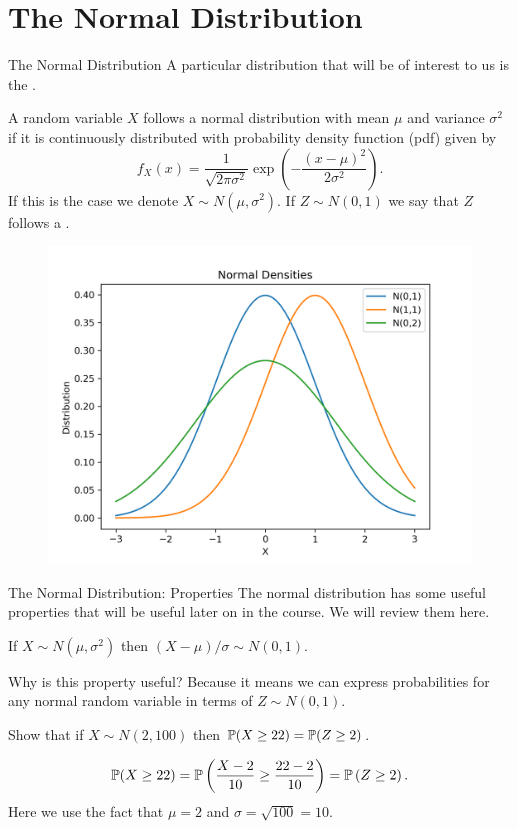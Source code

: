 \documentclass[notheorems,9pt, handout]{beamer}
\begin{document}
\section{The Normal Distribution}
\begin{frame}{The Normal Distribution} 
	\label{frame:nd-into}
	A particular distribution that will be of interest to us is the .
	\begin{definition}
		\label{def:nd}
		A random variable \(X\) follows a normal distribution with mean \(\mu\) and variance \(\sigma^2\) if it is continuously distributed with probability density function (pdf) given by 
		\begin{equation}
			f_X(x) = \frac{1}{\sqrt{2\pi\sigma^2}}\exp\left(-\frac{(x-\mu)^2}{2\sigma^2}\right)
		.\end{equation} 
		If this is the case we denote \(X\sim N(\mu,\sigma^2)\). If \(Z\sim N(0,1)\) we say that \(Z\) follows a .	
	\end{definition}
	\begin{figure}[htpb]
		\centering
		\includegraphics[width=0.4\linewidth]{normal-density.png}	
	\end{figure}
\end{frame}
\begin{frame}{The Normal Distribution: Properties} 
	\label{frame:nd-properties}
	The normal distribution has some useful properties that will be useful later on in the course. We will review them here.
	
	 If \(X\sim N(\mu,\sigma^2)\) then \((X-\mu)/\sigma\sim N(0,1)\).

	Why is this property useful? Because it means we can express probabilities for any normal random variable in terms of \(Z\sim N(0,1)\).

	 Show that if \(X\sim N(2,100)\) then \(\P(X\geq 22) = \P(Z\geq 2)\).

	\[
		\P(X\geq 22) = \P\left(\frac{X-2}{10} \geq \frac{22 -2}{10} \right) = \P\left(Z \geq 2\right) 
	.\] 
	Here we use the fact that \(\mu=2\) and \(\sigma = \sqrt{100} = 10\).
\end{frame}
\end{document}
